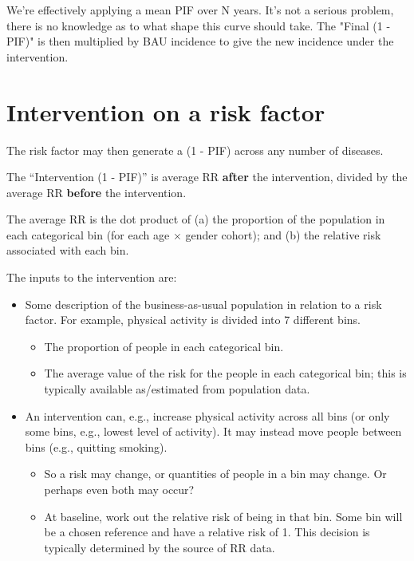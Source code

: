 \documentclass[12pt]{scrartcl}
\begin{document}
We're effectively applying a mean PIF over N years. It's not a serious problem, there is no knowledge as to what shape this curve should take. The "Final (1 - PIF)" is then multiplied by BAU incidence to give the new incidence under the intervention.

\section*{Intervention on a risk factor}

The risk factor may then generate a (1 - PIF) across any number of diseases.

The ``Intervention (1 - PIF)'' is average RR \textbf{after} the intervention, divided by the average RR \textbf{before} the intervention.

The average RR is the dot product of (a) the proportion of the population in
each categorical bin (for each age \(\times\) gender cohort); and (b) the
relative risk associated with each bin.

The inputs to the intervention are:

\begin{itemize}
\item Some description of the business-as-usual population in relation to a risk factor. For example, physical activity is divided into 7 different bins.
  \begin{itemize}
  \item The proportion of people in each categorical bin.
  \item The average value of the risk for the people in each categorical bin; this is typically available as/estimated from population data.
  \end{itemize}
\item An intervention can, e.g., increase physical activity across all bins (or only some bins, e.g., lowest level of activity). It may instead move people between bins (e.g., quitting smoking).
  \begin{itemize}
  \item So a risk may change, or quantities of people in a bin may change. Or perhaps even both may occur?
  \item At baseline, work out the relative risk of being in that bin. Some bin will be a chosen reference and have a relative risk of 1. This decision is typically determined by the source of RR data.
  \end{itemize}
\end{itemize}
\end{document}
